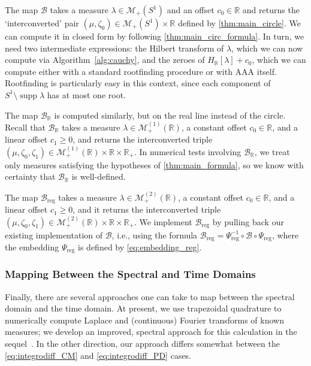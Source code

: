 \documentclass{cams-l} %
\newcommand{\RR}{\mathbb R}
\newcommand{\cM}{\mathcal M}
\newcommand{\cB}{\mathcal B}
\newcommand{\supp}{\operatorname{supp}}
\theoremstyle{definition}
\theoremstyle{remark}
\numberwithin{equation}{section}
\begin{document}
The map $\cB$ takes a measure $\lambda\in\cM_+(S^1)$ and an offset $c_0\in\RR$ and returns the `interconverted' pair $(\mu,\zeta_0)\in\cM_+(S^1)\times\RR$ defined by \cref{thm:main_circle}. We can compute it in closed form by following \cref{thm:main_circ_formula}. In turn, we need two intermediate expressions: the Hilbert transform of $\lambda$, which we can now compute via Algorithm~\ref{alg:cauchy}, and the zeroes of $H_\RR[\lambda]+c_0$, which we can compute either with a standard rootfinding procedure or with AAA itself. Rootfinding is particularly easy in this context, since each component of $S^1\setminus\supp\lambda$ has at most one root.


The map $\cB_\RR$ is computed similarly, but on the real line instead of the circle. Recall that $\cB_\RR$ takes a measure $\lambda\in\cM_+^{(1)}(\RR)$, a constant offset $c_0\in\RR$, and a linear offset $c_1\geq 0$, and returns the interconverted triple $(\mu,\zeta_0,\zeta_1)\in\cM_+^{(1)}(\RR)\times\RR\times\RR_+$. In numerical tests involving $\cB_\RR$, we treat only measures satisfying the hypotheses of \cref{thm:main_formula}, so we know with certainty that $\cB_\RR$ is well-defined.

The map $\cB_\mathrm{reg}$ takes a measure $\lambda\in\cM_+^{(2)}(\RR)$, a constant offset $c_0\in\RR$, and a linear offset $c_1\geq 0$, and it returns the interconverted triple $(\mu,\zeta_0,\zeta_1)\in\cM_+^{(2)}(\RR)\times\RR\times\RR_+$. We implement $\cB_\mathrm{reg}$ by pulling back our existing implementation of $\cB$, i.e., using the formula $\cB_\mathrm{reg} = \Psi^{-1}_\mathrm{reg}\circ\cB\circ\Psi_\mathrm{reg}$, where the embedding $\Psi_\mathrm{reg}$ is defined by \cref{eq:embedding_reg}.

\subsubsection{Mapping Between the Spectral and Time Domains}

Finally, there are several approaches one can take to map between the spectral domain and the time domain. At present, we use trapezoidal quadrature to numerically compute Laplace and (continuous) Fourier transforms of known measures; we develop an improved, spectral approach for this calculation in the sequel~\cite{sieve}. In the other direction, our approach differs somewhat between the \ref{eq:integrodiff_CM} and \ref{eq:integrodiff_PD} cases.
\end{document}
